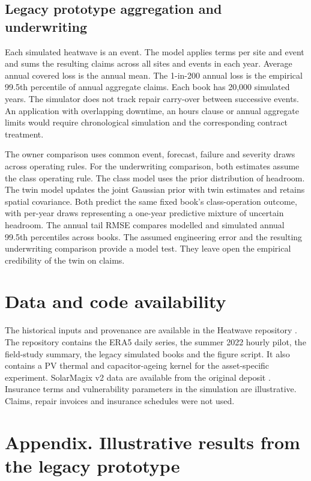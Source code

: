 \documentclass[11pt,a4paper]{article}
\begin{document}
\subsection*{Legacy prototype aggregation and underwriting}

Each simulated heatwave is an event. The model applies terms per site and event and sums the resulting claims across all sites and events in each year. Average annual covered loss is the annual mean. The 1-in-200 annual loss is the empirical 99.5th percentile of annual aggregate claims. Each book has 20,000 simulated years. The simulator does not track repair carry-over between successive events. An application with overlapping downtime, an hours clause or annual aggregate limits would require chronological simulation and the corresponding contract treatment.

The owner comparison uses common event, forecast, failure and severity draws across operating rules. For the underwriting comparison, both estimates assume the class operating rule. The class model uses the prior distribution of headroom. The twin model updates the joint Gaussian prior with twin estimates and retains spatial covariance. Both predict the same fixed book's class-operation outcome, with per-year draws representing a one-year predictive mixture of uncertain headroom. The annual tail RMSE compares modelled and simulated annual 99.5th percentiles across books. The assumed engineering error and the resulting underwriting comparison provide a model test. They leave open the empirical credibility of the twin on claims.

\section*{Data and code availability}

The historical inputs and provenance are available in the Heatwave repository \cite{heatwave}. The repository contains the ERA5 daily series, the summer 2022 hourly pilot, the field-study summary, the legacy simulated books and the figure script. It also contains a PV thermal and capacitor-ageing kernel for the asset-specific experiment. SolarMagix v2 data are available from the original deposit \cite{solarmagix}. Insurance terms and vulnerability parameters in the simulation are illustrative. Claims, repair invoices and insurance schedules were not used.

\section*{Appendix. Illustrative results from the legacy prototype}
\end{document}
